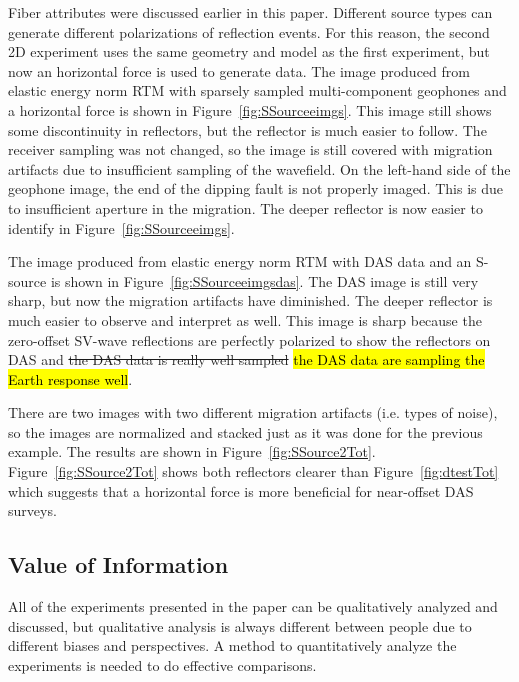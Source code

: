 
Fiber attributes were discussed earlier in this paper. Different source types can generate different polarizations of reflection events. For this reason, the second 2D experiment uses the same geometry and model as the first experiment, but now an horizontal force is used to generate data. The image produced from elastic energy norm RTM with sparsely sampled multi-component geophones and a horizontal force is shown in Figure~\ref{fig:SSourceeimgs}. This image still shows some discontinuity in reflectors, but the reflector is much easier to follow. The receiver sampling was not changed, so the image is still covered with migration artifacts due to insufficient sampling of the wavefield. On the left-hand side of the geophone image, the end of the dipping fault is not properly imaged. This is due to insufficient aperture in the migration. The deeper reflector is now easier to identify in Figure~\ref{fig:SSourceeimgs}.

The image produced from elastic energy norm RTM with DAS data and an S-source is shown in Figure~\ref{fig:SSourceeimgsdas}. The DAS image is still very sharp, but now the migration artifacts have diminished. The deeper reflector is much easier to observe and interpret as well. This image is sharp because the zero-offset SV-wave reflections are perfectly polarized to show the reflectors on DAS and \sout{the DAS data is really well sampled} \hl{the DAS data are sampling the Earth response well}.

There are two images with two different migration artifacts (i.e. types of noise), so the images are normalized and stacked just as it was done for the previous example. The results are shown in Figure~\ref{fig:SSource2Tot}. Figure~\ref{fig:SSource2Tot} shows both reflectors clearer than Figure~\ref{fig:dtestTot} which suggests that a horizontal force is more beneficial for near-offset DAS surveys.



\subsection{Value of Information}
All of the experiments presented in the paper can be qualitatively analyzed and discussed, but qualitative analysis is always different between people due to different biases and perspectives. A method to quantitatively analyze the experiments is needed to do effective comparisons.

